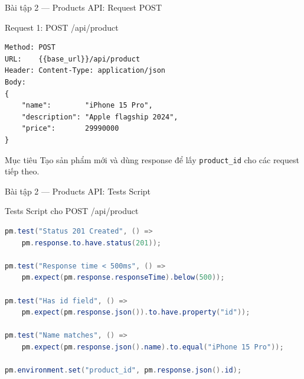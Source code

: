 \documentclass[aspectratio=169,10pt]{beamer}
\begin{document}
\begin{frame}[fragile]{Bài tập 2 --- Products API: Request POST}
  \begin{block}{Request 1: POST /api/product}
\begin{lstlisting}[style=json,language={}]
Method: POST
URL:    {{base_url}}/api/product
Header: Content-Type: application/json
Body:
{
    "name":        "iPhone 15 Pro",
    "description": "Apple flagship 2024",
    "price":       29990000
}
\end{lstlisting}
  \end{block}

  \begin{alertblock}{Mục tiêu}
    Tạo sản phẩm mới và dùng response để lấy \texttt{product\_id}
    cho các request tiếp theo.
  \end{alertblock}
\end{frame}

\begin{frame}[fragile]{Bài tập 2 --- Products API: Tests Script}
  \begin{block}{Tests Script cho POST /api/product}
\begin{lstlisting}[language=Java,style=nonumber]
pm.test("Status 201 Created", () =>
    pm.response.to.have.status(201));

pm.test("Response time < 500ms", () =>
    pm.expect(pm.response.responseTime).below(500));

pm.test("Has id field", () =>
    pm.expect(pm.response.json()).to.have.property("id"));

pm.test("Name matches", () =>
    pm.expect(pm.response.json().name).to.equal("iPhone 15 Pro"));

pm.environment.set("product_id", pm.response.json().id);
\end{lstlisting}
  \end{block}
\end{frame}
\end{document}
